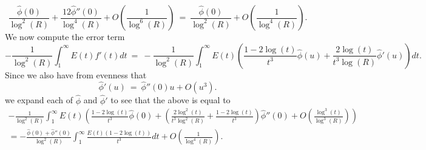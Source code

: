 \documentclass[11pt, reqno]{amsart}
\makeatletter
\renewenvironment{proof}[1][\proofname]{\par
  \vspace{-.7\topsep}%
  \pushQED{\qed}%
  \normalfont
  \topsep0pt \partopsep0pt %
  \trivlist
  \item[\hskip\labelsep
        \itshape
    #1\@addpunct{.}]\ignorespaces
}{%
  \popQED\endtrivlist\@endpefalse
  \addvspace{6pt plus 6pt} %
}
\theoremstyle{definition}
\theoremstyle{remark}
\numberwithin{equation}{section}
\renewcommand{\hat}{\widehat}
\makeatother
\begin{document}
\begin{proof}
\begin{equation}
\frac{\hat\phi(0)}{\log^2(R)}+\frac{12 \hat\phi''(0)}{\log^4(R)}+O\left(\frac{1}{\log^6(R)}\right) \ = \ \frac{\hat\phi(0)}{\log^2(R)}+O\left(\frac{1}{\log^4(R)}\right).
\end{equation}
We now compute the error term
\begin{equation}
    -\frac{1}{\log^2(R)}\int_1^\infty E(t) f'(t)dt \ = \ -\frac{1}{\log^2(R)}\int_1^\infty E(t) \left(\frac{1-2\log(t)}{t^3}\hat\phi(u)+\frac{2\log(t)}{t^3\log(R)}\hat\phi'(u)\right)dt.
\end{equation}
Since we also have from evenness that
\begin{equation}
\hat{\phi}'(u) \ = \ \hat{\phi}''(0)u+O(u^3).
\end{equation}
we expand each of $\hat \phi $ and $\hat\phi'$ to see that the above is equal to
\begin{align}
    -\frac{1}{\log^2(R)}\int_1^\infty E(t)\left(\frac{1-2\log(t)}{t^3}\hat\phi(0)+\left(\frac{2\log^2(t)}{t^3\log^2(R)}+\frac{1-2\log(t)}{t^3}\right)\hat\phi''(0)+O\left(\frac{\log^3 (t)}{\log^3(R)}\right)\right)\nonumber\\
    =-\frac{\hat \phi(0)+\hat\phi''(0)}{\log^2(R)}\int_1^\infty \frac{E(t)(1-2\log(t))}{t^3}dt+O\left(\frac{1}{\log^4(R)}\right).
\end{align}
\end{proof}
\end{document}
